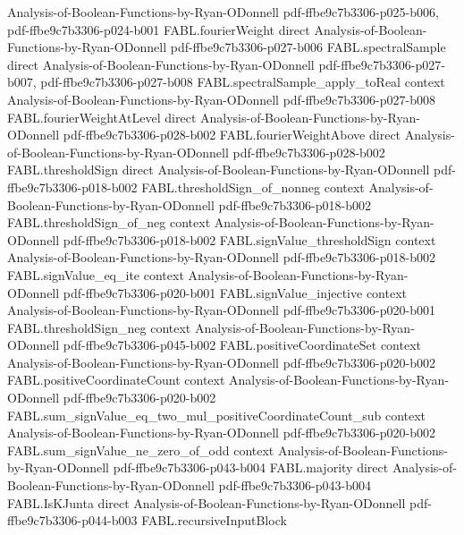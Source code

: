 \begin{theorem}
  {Analysis-of-Boolean-Functions-by-Ryan-ODonnell}
  {pdf-ffbe9c7b3306-p025-b006,
    pdf-ffbe9c7b3306-p024-b001}
\proofstep
  {FABL.fourierWeight}
  {direct}
  {Analysis-of-Boolean-Functions-by-Ryan-ODonnell}
  {pdf-ffbe9c7b3306-p027-b006}
\proofstep
  {FABL.spectralSample}
  {direct}
  {Analysis-of-Boolean-Functions-by-Ryan-ODonnell}
  {pdf-ffbe9c7b3306-p027-b007,
    pdf-ffbe9c7b3306-p027-b008}
\proofstep
  {FABL.spectralSample_apply_toReal}
  {context}
  {Analysis-of-Boolean-Functions-by-Ryan-ODonnell}
  {pdf-ffbe9c7b3306-p027-b008}
\proofstep
  {FABL.fourierWeightAtLevel}
  {direct}
  {Analysis-of-Boolean-Functions-by-Ryan-ODonnell}
  {pdf-ffbe9c7b3306-p028-b002}
\proofstep
  {FABL.fourierWeightAbove}
  {direct}
  {Analysis-of-Boolean-Functions-by-Ryan-ODonnell}
  {pdf-ffbe9c7b3306-p028-b002}
\proofstep
  {FABL.thresholdSign}
  {direct}
  {Analysis-of-Boolean-Functions-by-Ryan-ODonnell}
  {pdf-ffbe9c7b3306-p018-b002}
\proofstep
  {FABL.thresholdSign_of_nonneg}
  {context}
  {Analysis-of-Boolean-Functions-by-Ryan-ODonnell}
  {pdf-ffbe9c7b3306-p018-b002}
\proofstep
  {FABL.thresholdSign_of_neg}
  {context}
  {Analysis-of-Boolean-Functions-by-Ryan-ODonnell}
  {pdf-ffbe9c7b3306-p018-b002}
\proofstep
  {FABL.signValue_thresholdSign}
  {context}
  {Analysis-of-Boolean-Functions-by-Ryan-ODonnell}
  {pdf-ffbe9c7b3306-p018-b002}
\proofstep
  {FABL.signValue_eq_ite}
  {context}
  {Analysis-of-Boolean-Functions-by-Ryan-ODonnell}
  {pdf-ffbe9c7b3306-p020-b001}
\proofstep
  {FABL.signValue_injective}
  {context}
  {Analysis-of-Boolean-Functions-by-Ryan-ODonnell}
  {pdf-ffbe9c7b3306-p020-b001}
\proofstep
  {FABL.thresholdSign_neg}
  {context}
  {Analysis-of-Boolean-Functions-by-Ryan-ODonnell}
  {pdf-ffbe9c7b3306-p045-b002}
\proofstep
  {FABL.positiveCoordinateSet}
  {context}
  {Analysis-of-Boolean-Functions-by-Ryan-ODonnell}
  {pdf-ffbe9c7b3306-p020-b002}
\proofstep
  {FABL.positiveCoordinateCount}
  {context}
  {Analysis-of-Boolean-Functions-by-Ryan-ODonnell}
  {pdf-ffbe9c7b3306-p020-b002}
\proofstep
  {FABL.sum_signValue_eq_two_mul_positiveCoordinateCount_sub}
  {context}
  {Analysis-of-Boolean-Functions-by-Ryan-ODonnell}
  {pdf-ffbe9c7b3306-p020-b002}
\proofstep
  {FABL.sum_signValue_ne_zero_of_odd}
  {context}
  {Analysis-of-Boolean-Functions-by-Ryan-ODonnell}
  {pdf-ffbe9c7b3306-p043-b004}
\proofstep
  {FABL.majority}
  {direct}
  {Analysis-of-Boolean-Functions-by-Ryan-ODonnell}
  {pdf-ffbe9c7b3306-p043-b004}
\proofstep
  {FABL.IsKJunta}
  {direct}
  {Analysis-of-Boolean-Functions-by-Ryan-ODonnell}
  {pdf-ffbe9c7b3306-p044-b003}
\proofstep
  {FABL.recursiveInputBlock}

\end{theorem}
